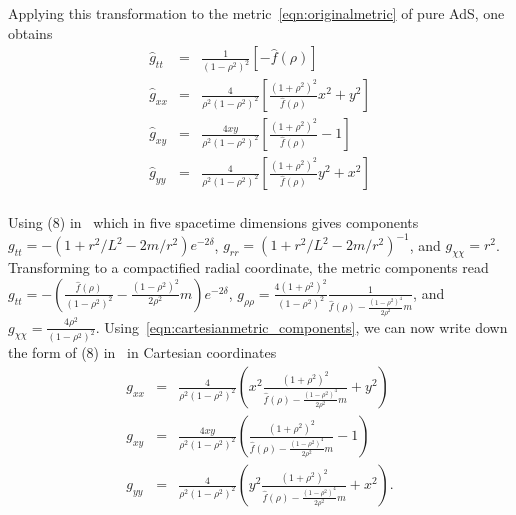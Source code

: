 \documentclass[prl,twocolumn,superscriptaddress]{revtex4-1}
\begin{document}
Applying this transformation to the metric~\eqref{eqn:originalmetric} of pure AdS, one obtains
\begin{eqnarray}\label{eqn:ads_cartesianmetric_components}
\hat{g}_{tt} &=& \frac{1}{(1-\rho^2)^2} \left[ -\hat{f}(\rho) \right] \nonumber \\
\hat{g}_{xx} &=& \frac{4}{\rho^2(1-\rho^2)^2} \left[ \frac{(1+\rho^2)^2}{\hat{f}(\rho)} x^2 + y^2 \right] \nonumber \\
\hat{g}_{xy} &=& \frac{4xy}{\rho^2(1-\rho^2)^2} \left[ \frac{(1+\rho^2)^2}{\hat{f}(\rho)} - 1 \right] \nonumber \\
\hat{g}_{yy} &=& \frac{4}{\rho^2(1-\rho^2)^2} \left[ \frac{(1+\rho^2)^2}{\hat{f}(\rho)} y^2 + x^2 \right] \nonumber \\
\end{eqnarray}

Using (8) in~\cite{Astefanesei:2003qy} which in five spacetime dimensions gives components $g_{tt}=-\left( 1+r^2/L^2-2m/r^2\right) e^{-2\delta}$, $g_{rr}=\left( 1+r^2/L^2-2m/r^2\right)^{-1}$, and $g_{\chi\chi}=r^2$.
Transforming to a compactified radial coordinate, the metric components read $g_{tt}=-\left( \frac{\hat{f}(\rho)}{(1-\rho^2)^2} - \frac{(1-\rho^2)^2}{2\rho^2} m \right) e^{-2\delta}$, $g_{\rho\rho}=\frac{4(1+\rho^2)^2}{(1-\rho^2)^2} \frac{1}{\hat{f}(\rho) - \frac{(1-\rho^2)^4}{2\rho^2} m}$, and $g_{\chi\chi}=\frac{4\rho^2}{(1-\rho^2)^2}$.
Using~\eqref{eqn:cartesianmetric_components}, we can now write down the form of (8) in~\cite{Astefanesei:2003qy} in Cartesian coordinates
\begin{eqnarray}\label{eqn:full_cartesianmetric_components}
g_{xx} &=& \frac{4}{\rho^2(1-\rho^2)^2} \left( x^2 \frac{(1+\rho^2)^2}{\hat{f}(\rho) - \frac{(1-\rho^2)^4}{2\rho^2} m} + y^2 \right) \nonumber \\
g_{xy} &=& \frac{4xy}{\rho^2(1-\rho^2)^2} \left( \frac{(1+\rho^2)^2}{\hat{f}(\rho) - \frac{(1-\rho^2)^4}{2\rho^2} m} - 1 \right) \nonumber \\
g_{yy} &=& \frac{4}{\rho^2(1-\rho^2)^2} \left( y^2 \frac{(1+\rho^2)^2}{\hat{f}(\rho) - \frac{(1-\rho^2)^4}{2\rho^2} m} + x^2 \right).
\end{eqnarray}
\end{document}
